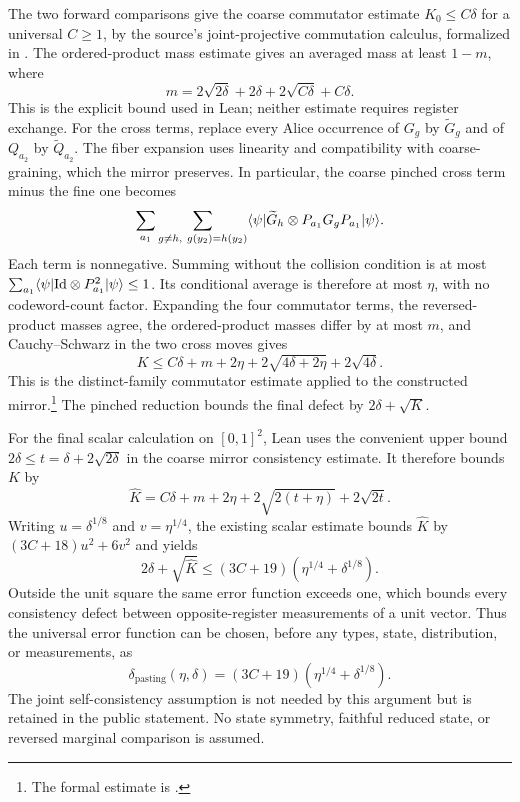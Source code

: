 \documentclass[11pt]{article}
\begin{document}
The two forward comparisons give the coarse commutator estimate
$K_0\leq C\delta$ for a universal $C\geq1$, by the source's joint-projective
commutation calculus, formalized in .
The ordered-product mass estimate  gives
an averaged mass at least $1-m$, where
\[
 m=2\sqrt{2\delta}+2\delta+2\sqrt{C\delta}+C\delta.
\]
This is the explicit bound used in Lean; neither estimate requires register
exchange. For the cross terms, replace every Alice occurrence of $G_g$ by
$\widetilde G_g$ and of $Q_{a_2}$ by $\widetilde Q_{a_2}$.
The fiber expansion uses linearity and compatibility with coarse-graining,
which the mirror preserves. In particular, the coarse pinched cross term
minus the fine one becomes
\[
 \sum_{a_1}\sum_{g\neq h,\ g(y_2)=h(y_2)}
 \langle\psi|\widetilde G_h\otimes P_{a_1}G_gP_{a_1}|\psi\rangle.
\]
Each term is nonnegative. Summing without the collision condition is at most
$\sum_{a_1}\langle\psi|\mathrm{Id}\otimes P_{a_1}^2|\psi\rangle\leq1$.
Its conditional average is therefore at most $\eta$, with no codeword-count
factor. Expanding the four commutator terms, the reversed-product masses
agree, the ordered-product masses differ by at most $m$, and Cauchy--Schwarz
in the two cross moves gives
\[
 K\leq C\delta+m+2\eta+2\sqrt{4\delta+2\eta}+2\sqrt{4\delta}.
\]
This is the distinct-family commutator estimate applied to the constructed
mirror.\footnote{The formal estimate is
.}
The pinched reduction bounds the final defect by
$2\delta+\sqrt K$.

For the final scalar calculation on $[0,1]^2$, Lean uses the convenient
upper bound $2\delta\leq t=\delta+2\sqrt{2\delta}$ in the coarse mirror
consistency estimate. It therefore bounds $K$ by
\[
 \widehat K=C\delta+m+2\eta+2\sqrt{2(t+\eta)}+2\sqrt{2t}.
\]
Writing $u=\delta^{1/8}$ and $v=\eta^{1/4}$, the existing scalar estimate
 bounds
$\widehat K$ by $(3C+18)u^2+6v^2$ and yields
\[
 2\delta+\sqrt{\widehat K}\leq(3C+19)(\eta^{1/4}+\delta^{1/8}).
\]
Outside the unit square the same error function exceeds one, which bounds
every consistency defect between opposite-register measurements of a unit
vector. Thus the universal error function can be chosen, before any types,
state, distribution, or measurements, as
\[
 \delta_{\mathrm{pasting}}(\eta,\delta)
   =(3C+19)(\eta^{1/4}+\delta^{1/8}).
\]
The joint self-consistency assumption is not needed by this argument but is
retained in the public statement. No state symmetry, faithful reduced state,
or reversed marginal comparison is assumed.
\end{document}
